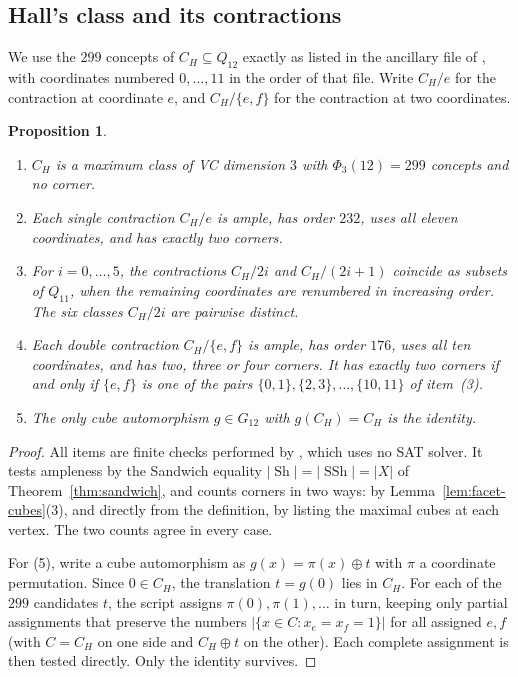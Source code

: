 \documentclass[11pt]{article}
\numberwithin{equation}{section}
\newtheorem{proposition}[theorem]{Proposition}
\theoremstyle{definition}
\theoremstyle{remark}
\newcommand{\Sh}{\operatorname{Sh}}
\newcommand{\SSh}{\operatorname{SSh}}
\begin{document}
\subsection{Hall's class and its contractions}

We use the \(299\) concepts of \(C_H\subseteq Q_{12}\) exactly as listed in
the ancillary file of \cite{ChalopiChepoiMoran22}, with coordinates numbered
\(0,\dots,11\) in the order of that file.  Write \(C_H/e\) for the
contraction at coordinate \(e\), and \(C_H/\{e,f\}\) for the contraction at
two coordinates.

\begin{proposition}
\label{prop:hall-structure}
\begin{enumerate}
\item \(C_H\) is a maximum class of VC dimension \(3\) with
      \(\Phi_3(12)=299\) concepts and no corner.
\item Each single contraction \(C_H/e\) is ample, has order \(232\), uses
      all eleven coordinates, and has exactly two corners.
\item For \(i=0,\dots,5\), the contractions \(C_H/2i\) and \(C_H/(2i+1)\)
      coincide as subsets of \(Q_{11}\), when the remaining coordinates are
      renumbered in increasing order.  The six classes \(C_H/2i\) are
      pairwise distinct.
\item Each double contraction \(C_H/\{e,f\}\) is ample, has order \(176\),
      uses all ten coordinates, and has two, three or four corners.  It has
      exactly two corners if and only if \(\{e,f\}\) is one of the pairs
      \(\{0,1\},\{2,3\},\dots,\{10,11\}\) of item~(3).
\item The only cube automorphism \(g\in G_{12}\) with \(g(C_H)=C_H\) is
      the identity.
\end{enumerate}
\end{proposition}

\begin{proof}
All items are finite checks performed by
, which uses no SAT solver.  It
tests ampleness by the Sandwich equality \(|\Sh|=|\SSh|=|X|\) of
Theorem~\ref{thm:sandwich}, and counts corners in two ways: by
Lemma~\ref{lem:facet-cubes}(3), and directly from the definition, by listing
the maximal cubes at each vertex.  The two counts agree in every case.

For (5), write a cube automorphism as \(g(x)=\pi(x)\oplus t\) with \(\pi\) a
coordinate permutation.  Since \(0\in C_H\), the translation \(t=g(0)\)
lies in \(C_H\).  For each of the \(299\) candidates \(t\), the script
assigns \(\pi(0),\pi(1),\dots\) in turn, keeping only partial assignments
that preserve the numbers \(|\{x\in C:x_e=x_f=1\}|\) for all assigned
\(e,f\) (with \(C=C_H\) on one side and \(C_H\oplus t\) on the other).  Each
complete assignment is then tested directly.  Only the identity survives.
\end{proof}
\end{document}
